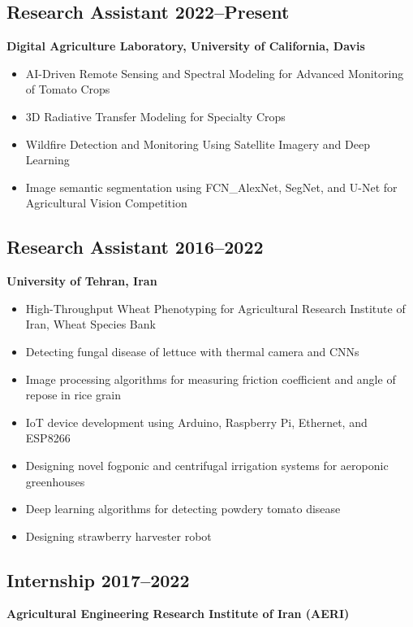 \documentclass[11pt,a4paper]{article}
\begin{document}
\subsection{\texorpdfstring{Research Assistant \hfill 2022--Present}{Research Assistant (2022--Present)}}
\textbf{Digital Agriculture Laboratory, University of California, Davis}
\begin{itemize}
    \item AI-Driven Remote Sensing and Spectral Modeling for Advanced Monitoring of Tomato Crops
    \item 3D Radiative Transfer Modeling for Specialty Crops
    \item Wildfire Detection and Monitoring Using Satellite Imagery and Deep Learning
    \item Image semantic segmentation using FCN\_AlexNet, SegNet, and U-Net for Agricultural Vision Competition
\end{itemize}

\subsection{\texorpdfstring{Research Assistant \hfill 2016--2022}{Research Assistant (2016--2022)}}
\textbf{University of Tehran, Iran}
\begin{itemize}
    \item High-Throughput Wheat Phenotyping for Agricultural Research Institute of Iran, Wheat Species Bank
    \item Detecting fungal disease of lettuce with thermal camera and CNNs
    \item Image processing algorithms for measuring friction coefficient and angle of repose in rice grain
    \item IoT device development using Arduino, Raspberry Pi, Ethernet, and ESP8266
    \item Designing novel fogponic and centrifugal irrigation systems for aeroponic greenhouses
    \item Deep learning algorithms for detecting powdery tomato disease
    \item Designing strawberry harvester robot
\end{itemize}



\subsection{\texorpdfstring{Internship \hfill 2017--2022}{Internship (2017--2022)}}
\textbf{Agricultural Engineering Research Institute of Iran (AERI)}
\end{document}
